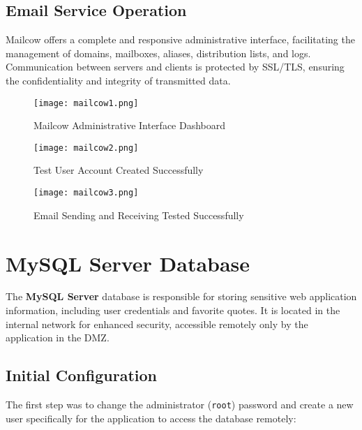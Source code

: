 \documentclass[12pt]{report}
\begin{document}
\subsection*{Email Service Operation}

Mailcow offers a complete and responsive administrative interface, facilitating the management of domains, mailboxes, aliases, distribution lists, and logs. Communication between servers and clients is protected by SSL/TLS, ensuring the confidentiality and integrity of transmitted data.

\begin{figure}[h]
    \centering
    \texttt{[image: mailcow1.png]}
    \caption{Mailcow Administrative Interface Dashboard}
    \label{fig:mailcow-dashboard}
\end{figure}

\begin{figure}[h]
    \centering
    \texttt{[image: mailcow2.png]}
    \caption{Test User Account Created Successfully}
    \label{fig:mailcow-user}
\end{figure}

\begin{figure}[h]
    \centering
    \texttt{[image: mailcow3.png]}
    \caption{Email Sending and Receiving Tested Successfully}
    \label{fig:mailcow-email}
\end{figure}

\clearpage
\section*{MySQL Server Database}

The \textbf{MySQL Server} database is responsible for storing sensitive web application information, including user credentials and favorite quotes. It is located in the internal network for enhanced security, accessible remotely only by the application in the DMZ.

\subsection*{Initial Configuration}

The first step was to change the administrator (\texttt{root}) password and create a new user specifically for the application to access the database remotely:
\end{document}

